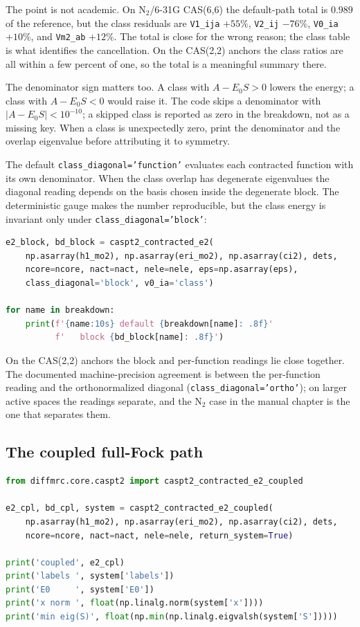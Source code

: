 The point is not academic.  On N$_2$/6-31G CAS(6,6) the default-path
total is $0.989$ of the reference, but the class residuals are
\texttt{V1\_ija} $+55\%$, \texttt{V2\_ij} $-76\%$, \texttt{V0\_ia}
$+10\%$, and \texttt{Vm2\_ab} $+12\%$.  The total is close for the
wrong reason; the class table is what identifies the cancellation.
On the CAS(2,2) anchors the class ratios are all within a few percent
of one, so the total is a meaningful summary there.

The denominator sign matters too.  A class with $A-E_0S>0$ lowers the
energy; a class with $A-E_0S<0$ would raise it.  The code skips a
denominator with $|A-E_0S|<10^{-10}$; a skipped class is reported as
zero in the breakdown, not as a missing key.  When a class is
unexpectedly zero, print the denominator and the overlap eigenvalue
before attributing it to symmetry.

The default \texttt{class\_diagonal='function'} evaluates each
contracted function with its own denominator.  When the class overlap
has degenerate eigenvalues the diagonal reading depends on the basis
chosen inside the degenerate block.  The deterministic gauge makes the
number reproducible, but the class energy is invariant only under
\texttt{class\_diagonal='block'}:

\begin{lstlisting}[language=Python]
e2_block, bd_block = caspt2_contracted_e2(
    np.asarray(h1_mo2), np.asarray(eri_mo2), np.asarray(ci2), dets,
    ncore=ncore, nact=nact, nele=nele, eps=np.asarray(eps),
    class_diagonal='block', v0_ia='class')

for name in breakdown:
    print(f'{name:10s} default {breakdown[name]: .8f}'
          f'   block {bd_block[name]: .8f}')
\end{lstlisting}

On the CAS(2,2) anchors the block and per-function readings lie close
together.  The documented machine-precision agreement is between the
per-function reading and the orthonormalized diagonal
(\texttt{class\_diagonal='ortho'}); on larger active spaces the
readings separate, and the N$_2$ case in the manual chapter is the one
that separates them.

\subsection{The coupled full-Fock path}

\begin{lstlisting}[language=Python]
from diffmrc.core.caspt2 import caspt2_contracted_e2_coupled

e2_cpl, bd_cpl, system = caspt2_contracted_e2_coupled(
    np.asarray(h1_mo2), np.asarray(eri_mo2), np.asarray(ci2), dets,
    ncore=ncore, nact=nact, nele=nele, return_system=True)

print('coupled', e2_cpl)
print('labels ', system['labels'])
print('E0     ', system['E0'])
print('x norm ', float(np.linalg.norm(system['x'])))
print('min eig(S)', float(np.min(np.linalg.eigvalsh(system['S']))))
\end{lstlisting}

